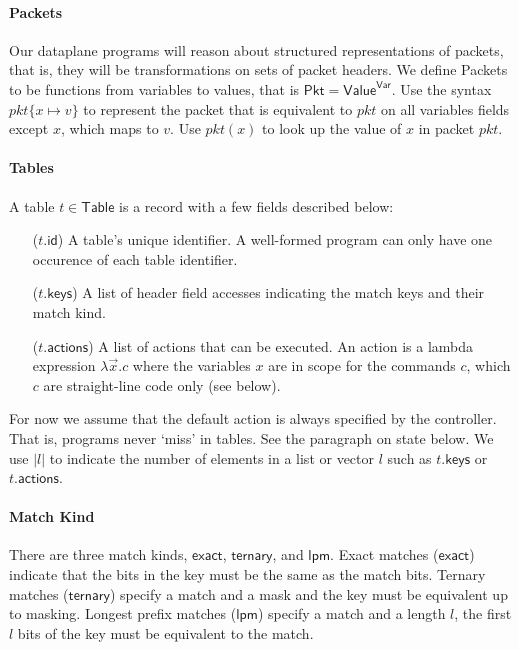 \documentclass{article}
\newcommand{\pkt}{\mathit{pkt}}
\newcommand{\Value}{\mathsf{Value}}
\newcommand{\Pkt}{\mathsf{Pkt}}
\newcommand{\Table}{\mathsf{Table}}
\newcommand{\Var}{\mathsf{Var}}
\newcommand{\actions}{\mathsf{actions}}
\newcommand{\keys}{\mathsf{keys}}
\newcommand{\id}{\mathsf{id}}
\newcommand{\exact}{\ensuremath{\mathsf{exact}}}
\newcommand{\ternary}{\ensuremath{\mathsf{ternary}}}
\newcommand{\lpm}{\ensuremath{\mathsf{lpm}}}
\theoremstyle{plain}
\theoremstyle{definition}
\theoremstyle{remark}
\begin{document}
\paragraph{Packets}
Our dataplane programs will reason about structured representations of packets,
that is, they will be transformations on sets of packet headers. We define
Packets to be functions from variables to values, that is $\Pkt = \Value^\Var$.
Use the syntax $\pkt\{x \mapsto v\}$ to represent the packet that is equivalent
to $\pkt$ on all variables fields except $x$, which maps to $v$. Use $\pkt(x)$
to look up the value of $x$ in packet $\pkt$.

\paragraph{Tables}
A table $t \in \Table$ is a record with a few fields described below:
\begin{enumerate}[align=left]
  \item[($t.\id$)] A table's unique identifier. A well-formed program can only
    have one occurence of each table identifier.
  \item[($t.\keys$)] A list of header field accesses indicating the match keys and their match kind.
  \item[($t.\actions$)] A list of actions that can be executed. An action is a lambda
    expression $\lambda \vec x. c$ where the variables $x$ are in scope for the
    commands $c$, which $c$ are straight-line code only (see below).
\end{enumerate}
For now we assume that the default action is always specified by the controller.
That is, programs never `miss' in tables. See the paragraph on state below. We use $|l|$ to indicate the number of
elements in a list or vector $l$ such as $t.\keys$ or $t.\actions$.

\paragraph{Match Kind}
There are three match kinds, \exact, \ternary, and \lpm. Exact matches (\exact)
indicate that the bits in the key must be the same as the match bits. Ternary
matches (\ternary) specify a match and a mask and the key must be equivalent up
to masking. Longest prefix matches (\lpm) specify a match and a length
$l$, the first $l$ bits of the key must be equivalent to the match.
\end{document}
